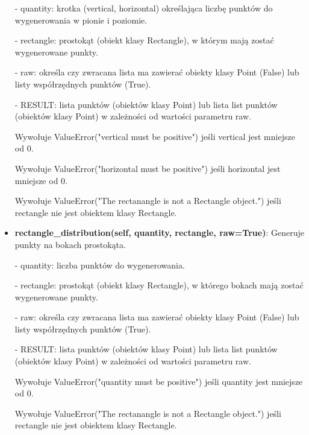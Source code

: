 \documentclass{lab}
\begin{document}
\begin{itemize}
  - quantity: krotka (vertical, horizontal) określająca liczbę punktów do wygenerowania w pionie i poziomie.

  - rectangle: prostokąt (obiekt klasy Rectangle), w którym mają zostać wygenerowane punkty.

  - raw: określa czy zwracana lista ma zawierać obiekty klasy Point (False) lub listy współrzędnych punktów (True).

  - RESULT: lista punktów (obiektów klasy Point) lub lista list punktów (obiektów klasy Point) w zależności od wartości parametru raw.

  Wywołuje ValueError("vertical must be positive") jeśli vertical jest mniejsze od 0.

  Wywołuje ValueError("horizontal must be positive") jeśli horizontal jest mniejsze od 0.

  Wywołuje ValueError("The rectanangle is not a Rectangle object.") jeśli rectangle nie jest obiektem klasy Rectangle.

  \item \textbf{rectangle\_distribution(self, quantity, rectangle, raw=True)}:
  Generuje punkty na bokach prostokąta.

  - quantity: liczba punktów do wygenerowania.

  - rectangle: prostokąt (obiekt klasy Rectangle), w którego bokach mają zostać wygenerowane punkty.

  - raw: określa czy zwracana lista ma zawierać obiekty klasy Point (False) lub listy współrzędnych punktów (True).

  - RESULT: lista punktów (obiektów klasy Point) lub lista list punktów (obiektów klasy Point) w zależności od wartości parametru raw.

  Wywołuje ValueError("quantity must be positive") jeśli quantity jest mniejsze od 0.

  Wywołuje ValueError("The rectanangle is not a Rectangle object.") jeśli rectangle nie jest obiektem klasy Rectangle.
\end{itemize}
\end{document}
